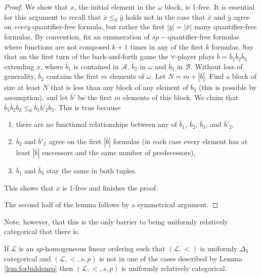 \documentclass[11pt]{amsart}
\theoremstyle{definition}
\def\A{\mathcal A}
\def\B{\mathcal{B}}
\def\L{\mathcal L}
\begin{document}
\begin{proof}
    We show that $x$, the initial element in the $\omega$ block, is 1-free.
    It is essential for this argument to recall that $\bar{x}\leq_0\bar{y}$ holds not in the case that $\bar{x}$ and $\bar{y}$ agree on \textit{every} quantifier-free formula, but rather the first $|\bar{y}|=|\bar{x}|$ many quantifier-free formulas.
    By convention, fix an enumeration of $sp-$quantifier-free formulas where functions are not composed $k+1$ times in any of the first $k$ formulas.
    Say that on the first turn of the back-and-forth game the $\forall$-player plays $\bar{b}=\bar{b}_1\bar{b}_2\bar{b}_3$ extending $x$, where $\bar{b}_1$ is contained in $\A$, $\bar{b}_2$ in $\omega$ and $\bar{b}_3$ in $\B$.
    Without loss of generality, $\bar{b}_2$ contains the first $m$ elements of $\omega$.
    Let $N=m+|\bar{b}|$.
    Find a block of size at least $N$ that is less than any block of any element of $\bar{b}_3$ (this is possible by assumption), and let $\bar{b}'$ be the first $m$ elements of this block.
    We claim that $\bar{b}_1\bar{b}_2\bar{b}_3\leq_0 \bar{b}_1\bar{b}'_2\bar{b}_3$.
    This is true because 
    \begin{enumerate}
        \item there are no functional relationships between any of $\bar{b}_1$, $\bar{b}_2$, $\bar{b}_3$, and  $\bar{b}'_2$,
        \item $\bar{b}_2$ and $\bar{b}'_2$ agree on the first $|\bar{b}|$ formulas (in each case every element has at least $|\bar{b}|$ successors and the same number of predecessors),
        \item $\bar{b}_1$ and $\bar{b}_3$ stay the same in both tuples.
    \end{enumerate}
    This shows that $x$ is 1-free and finishes the proof.

    The second half of the lemma follows by a symmetrical argument.
\end{proof}


Note, however, that this is the only barrier to being uniformly relatively categorical that there is.

\begin{lemma}\label{lem:allCasesSp}
    If $\L$ is an $sp$-homogeneous linear ordering such that $(\L,<)$ is uniformly $\Delta_3$ categorical and $(\L,<,s,p)$ is not in one of the cases described by Lemma \ref{lem:forbiddensp} then $(\L,<,s,p)$ is uniformly relatively categorical.
\end{lemma}
\end{document}
